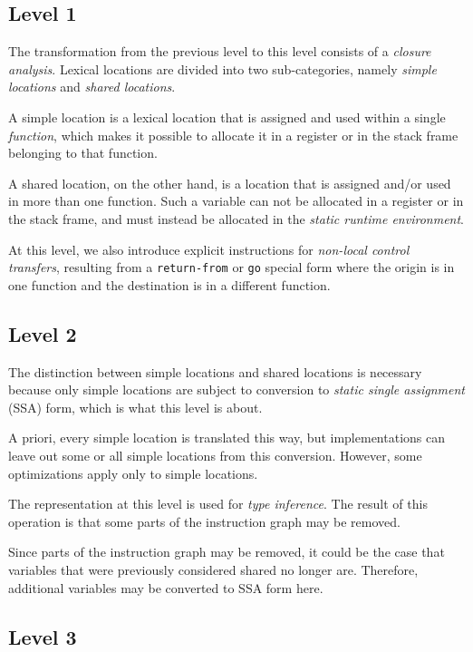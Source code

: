 \subsection{Level 1}

The transformation from the previous level to this level consists of a
\emph{closure analysis}.  Lexical locations are divided into two
sub-categories, namely \emph{simple locations} and \emph{shared
  locations}.  

A simple location is a lexical location that is assigned and used
within a single \emph{function}, which makes it possible to allocate
it in a register or in the stack frame belonging to that function.

A shared location, on the other hand, is a location that is assigned
and/or used in more than one function.  Such a variable can not be
allocated in a register or in the stack frame, and must instead be
allocated in the \emph{static runtime environment}. 

At this level, we also introduce explicit instructions for
\emph{non-local control transfers}, resulting from a
\texttt{return-from} or \texttt{go} special form where the origin is
in one function and the destination is in a different function.

\subsection{Level 2}

The distinction between simple locations and shared locations is
necessary because only simple locations are subject to conversion to
\emph{static single assignment} (SSA) form, which is what this level is
about.  

A priori, every simple location is translated this way, but
implementations can leave out some or all simple locations from this
conversion.  However, some optimizations apply only to simple
locations. 

The representation at this level is used for \emph{type inference}.
The result of this operation is that some parts of the instruction
graph may be removed.

Since parts of the instruction graph may be removed, it could be the
case that variables that were previously considered shared no longer
are.  Therefore, additional variables may be converted to SSA form
here. 

\subsection{Level 3}

